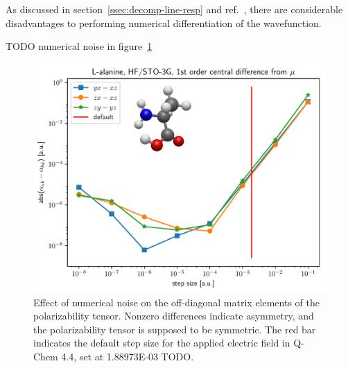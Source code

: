 \documentclass[%
class = book,%
crop = false,%
float = true,%
multi = true,%
preview = false,%
]{standalone}
\begin{document}

As discussed in section~\ref{ssec:decomp-line-resp} and ref.~\parencite{gauss2000}, there are considerable disadvantages to performing numerical differentiation of the wavefunction.

TODO numerical noise in figure~\ref{fig:finite-difference-numerical-noise}

\begin{figure}
  \centering
  \includegraphics[width=\textwidth]{./diff_overlay.pdf}
  \caption[Asymmetry in the 1st-order finite-difference polarizability]{Effect of numerical noise on the off-diagonal matrix elements of the polarizability tensor. Nonzero differences indicate asymmetry, and the polarizability tensor is supposed to be symmetric. The red bar indicates the default step size for the applied electric field in Q-Chem 4.4, set at \SI{1.88973E-03}{\au} TODO.}
  \label{fig:finite-difference-numerical-noise}
\end{figure}
\end{document}

